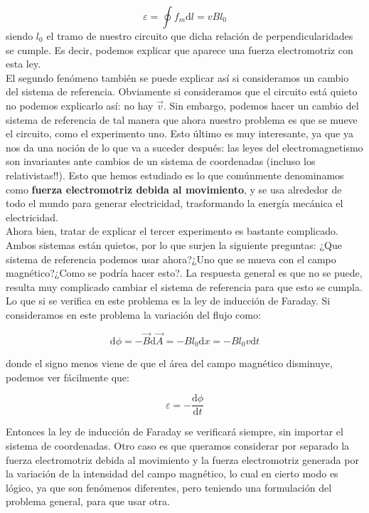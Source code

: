 \documentclass[12pt]{article}
\newcommand{\D}{\mathrm{d}}
\begin{document}
$$
\varepsilon = \oint f_m \D l = v B  l_0
$$
siendo $l_0$ el tramo de nuestro circuito que dicha relación de perpendicularidades se cumple. Es decir, podemos explicar que aparece una fuerza electromotriz con esta ley. \\

El segundo fenómeno también se puede explicar así si consideramos un cambio del sistema de referencia. Obviamente si consideramos que el circuito está quieto no podemos explicarlo así: no hay $\vec{v}$. Sin embargo, podemos hacer un cambio del sistema de referencia de tal manera que ahora nuestro problema es que se mueve el circuito, como el experimento uno. Esto último es muy interesante, ya que ya nos da una noción de lo que va a suceder después: las leyes del electromagnetismo son invariantes ante cambios de un sistema de coordenadas (incluso los relativistas!!). Esto que hemos estudiado es lo que comúnmente denominamos como \textbf{fuerza electromotriz debida al movimiento}, y se usa alrededor de todo el mundo para generar electricidad, trasformando la energía mecánica el electricidad. \\

Ahora bien, tratar de explicar el tercer experimento es bastante complicado. Ambos sistemas están quietos, por lo que surjen la siguiente preguntas: ¿Que sistema de referencia podemos usar ahora?¿Uno que se mueva con el campo magnético?¿Como se podría hacer esto?. La respuesta general es que no se puede, resulta muy complicado cambiar el sistema de referencia para que esto se cumpla. \\

Lo que si se verifica en este problema es la ley de inducción de Faraday. Si consideramos en este problema la variación del flujo como:

$$
\D \phi =  - \vec{B} \D \vec{A} = - B l_0 \D x = - B  l_0 v \D t 
$$

donde el signo menos viene de que el área del campo magnético disminuye, podemos ver fácilmente que:

\begin{equation}
\varepsilon = - \dfrac{\D \phi}{\D t}
\end{equation}

Entonces la ley de inducción de Faraday se verificará siempre, sin importar el sistema de coordenadas. Otro caso es que queramos considerar por separado la fuerza electromotriz debida al movimiento y la fuerza electromotriz generada por la variación de la intensidad del campo magnético, lo cual en cierto modo es lógico, ya que son fenómenos diferentes, pero teniendo una formulación del problema general, para que usar otra. 
\end{document}
